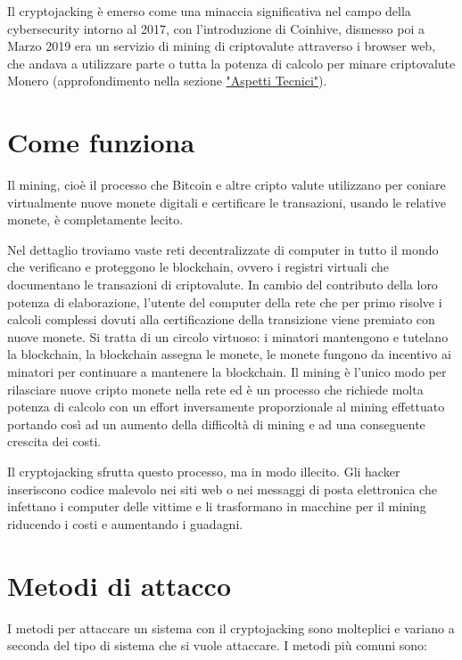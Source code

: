 \documentclass[12pt,a4paper]{article}
\begin{document}
Il cryptojacking è emerso come una minaccia significativa nel campo della
cybersecurity intorno al 2017, con l'introduzione di Coinhive, dismesso poi a
Marzo 2019 era un servizio di mining di criptovalute attraverso i browser web,
che andava a utilizzare parte o tutta la potenza di calcolo per minare
criptovalute Monero (approfondimento nella sezione
\hyperref[sec:aspetti_tecnici]{"Aspetti Tecnici"}). 

\newpage

\section{Come funziona}
Il mining, cioè il processo che Bitcoin e altre cripto valute utilizzano per
coniare virtualmente nuove monete digitali e certificare le transazioni, usando
le relative monete, è completamente lecito. 

Nel dettaglio troviamo vaste reti decentralizzate di computer in tutto il mondo
che verificano e proteggono le blockchain, ovvero i registri virtuali che
documentano le transazioni di criptovalute. In cambio del contributo della loro
potenza di elaborazione, l'utente del computer della rete che per primo risolve
i calcoli complessi dovuti alla certificazione della transizione viene premiato
con nuove monete. Si tratta di un circolo virtuoso: i minatori mantengono e
tutelano la blockchain, la blockchain assegna le monete, le monete fungono da
incentivo ai minatori per continuare a mantenere la blockchain. Il mining è
l'unico modo per rilasciare nuove cripto monete nella rete ed è un processo che
richiede molta potenza di calcolo con un effort inversamente proporzionale al
mining effettuato portando così ad un aumento della difficoltà di mining e ad
una conseguente crescita dei costi.

Il cryptojacking sfrutta questo processo, ma in modo illecito. Gli hacker
inseriscono codice malevolo nei siti web o nei messaggi di posta elettronica che
infettano i computer delle vittime e li trasformano in macchine per il mining
riducendo i costi e aumentando i guadagni.

\newpage

\section{Metodi di attacco}
I metodi per attaccare un sistema con il cryptojacking sono molteplici e variano
a seconda del tipo di sistema che si vuole attaccare. I metodi più comuni sono:
\end{document}
